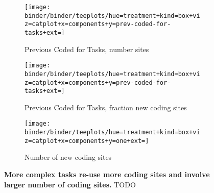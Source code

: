 \begin{figure*}
 \centering
  \begin{subfigure}[b]{0.3\textwidth}
      \centering
      \texttt{[image: binder/binder/teeplots/hue=treatment+kind=box+viz=catplot+x=components+y=prev-coded-for-tasks+ext=]}
      \caption{Previous Coded for Tasks, number sites}
      \label{fig:hard-task-gain-numsites-coded}
  \end{subfigure}
  \hfill
  \begin{subfigure}[b]{0.3\textwidth}
      \centering
      \texttt{[image: binder/binder/teeplots/hue=treatment+kind=box+viz=catplot+x=components+y=prev-coded-for-tasks+ext=]}
      \caption{Previous Coded for Tasks, fraction new coding sites}
      \label{fig:hard-task-gain-fracsites-coded}
  \end{subfigure}
  \hfill
  \begin{subfigure}[b]{0.3\textwidth}
      \centering
      \texttt{[image: binder/binder/teeplots/hue=treatment+kind=box+viz=catplot+x=components+y=one+ext=]}
      \caption{Number of new coding sites}
      \label{fig:hard-task-gain-numsites}
  \end{subfigure}
  \caption{
  \textbf{More complex tasks re-use more coding sites and involve larger number of coding sites.}
  \footnotesize
  TODO
  }
  \label{fig:hard-task-gain}
\end{figure*}
